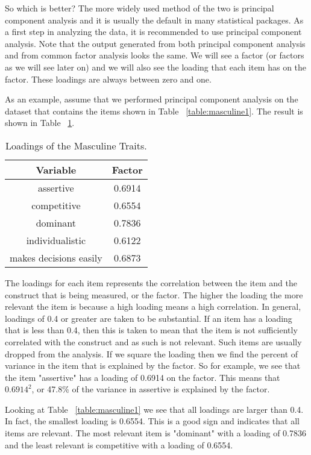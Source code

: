 \documentclass[a4paper,12pt,oneside]{book}
\begin{document}
So which is better? The more widely used method of the two is principal component analysis and it is usually the default in many statistical
packages. As a first step in analyzing the data, it is recommended to use principal component analysis. Note that the output generated from
both principal component analysis and from common factor analysis looks the same. We will see a factor (or factors as we will see later on) and 
we will also see the loading that each item has on the factor. These loadings are always between zero and one.

As an example, assume that we performed principal component analysis on the dataset that contains the items shown in Table ~\ref{table:masculine1}. 
The result is shown in Table ~\ref{table:factormasculine1}. 

\begin{table}[h!t]
	\caption{Loadings of the Masculine Traits.} \label{table:factormasculine1}
	\centering
	\begin{tabular}{c c}
	\hline
	{Variable} & {Factor} \\
	\hline
	assertive & 0.6914 \\
	competitive & 0.6554 \\
	dominant & 0.7836 \\
	individualistic & 0.6122 \\
	makes decisions easily & 0.6873 \\
	\hline
	\end{tabular}
\end{table}

The loadings for each item represents the correlation between the item and the construct that is being measured, or the factor. The higher the loading
the more relevant the item is because a high loading means a high correlation. In general, loadings of 0.4 or greater are taken to be substantial.
If an item has a loading that is less than 0.4, then this is taken to mean that the item is not sufficiently correlated with the construct and as 
such is not relevant. Such items are usually dropped from the analysis. If we square the loading then we find the percent of variance in the item 
that is explained by the factor. So for example, we see that the item "assertive" has a loading of 0.6914 on the factor. This means that 
$0.6914^{2}$, or 47.8\% of the variance in assertive is explained by the factor.  

Looking at Table ~\ref{table:masculine1} we see that all loadings are larger than 0.4. In fact, the smallest loading is 0.6554. This is a good sign
and indicates that all items are relevant. The most relevant item is "dominant" with a loading of 0.7836 and the least relevant is competitive
with a loading of 0.6554.
\end{document}
